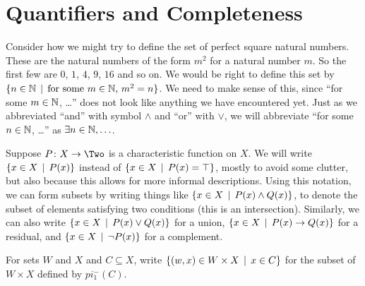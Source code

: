 \section{Quantifiers and Completeness}

Consider how we might try to define the set of perfect square natural numbers.
These are the natural numbers of the form $m^2$ for a natural number $m$.
So the first few are $0$, $1$, $4$, $9$, $16$ and so on.
We would be right to define this set by $\{n\in \mathbb N\,\mid\, \text{for some $m\in\mathbb N$, $m^2=n$}\}$.
We need to make sense of this, since ``for some $m\in \mathbb N$, \ldots'' does not look like anything we have encountered yet.
Just as we abbreviated ``and'' with symbol $\wedge$ and ``or'' with $\vee$, we will abbreviate ``for some $n\in\mathbb N$, \ldots'' as $\exists n\in \mathbb N,\ldots$. 

Suppose $\fromto PX\Two$ is a characteristic function on $X$.
We will write $\{x\in X\,\mid\, P(x)\}$ instead of $\{x\in X\,\mid\, P(x)=\top\}$, mostly to avoid some clutter, but also because this allows for more informal descriptions.
Using this notation, we can form subsets by writing things like $\{x\in X\,\mid\, P(x)\wedge Q(x)\}$, to denote the subset of elements satisfying two conditions (this is an intersection).
Similarly, we can also write $\{x\in X\,\mid\, P(x)\vee Q(x)\}$ for a union,
$\{x\in X\,\mid\, P(x)\to Q(x)\}$ for a residual, and $\{x\in X\,\mid\, \neg P(x)\}$ for a complement.

\begin{defn}
	For sets $W$ and $X$ and $C\subseteq X$, write $\{(w,x)\in W\times X\,\mid\, x\in C\}$ for the subset of $W\times X$ defined by $pi_1^-(C)$.
\end{defn}


